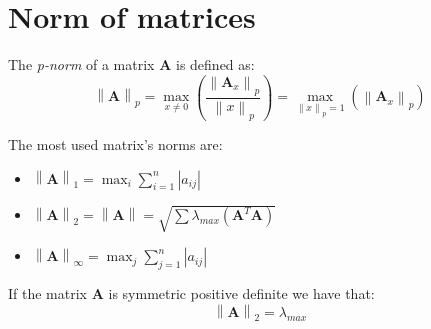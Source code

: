 \documentclass[12pt, a4paper]{report}
\newtheorem[style=M,bodystyle=\normalfont]{theorem}{Theorem}
\newtheorem[style=M,bodystyle=\normalfont]{proposition}{Proposition}
\newtheorem[style=M,bodystyle=\normalfont]{corollary}{Corollary}
\newtheorem[style=M,bodystyle=\normalfont]{lemma}{Lemma}
\newtheorem[style=M,bodystyle=\normalfont]{definition}{Definition}
\begin{document}
    \section{Norm of matrices}
    \begin{definition}
        The \emph{p-norm} of a matrix $\boldsymbol{A}$ is defined as: 
        \[\left\lVert \boldsymbol{A} \right\rVert_p=\max_{x \neq 0}{\left( \dfrac{\left\lVert \boldsymbol{A}_x \right\rVert_p}{\left\lVert x \right\rVert_p} \right)}=
        \max_{\left\lVert x \right\rVert_p=1}{\left( \left\lVert \boldsymbol{A}_x \right\rVert_p \right)}\]
    \end{definition}
    The most used matrix's norms are: 
    \begin{itemize}
        \item $\left\lVert \boldsymbol{A} \right\rVert_1=\max_{i}{\sum_{i=1}^{n}{\left\lvert a_{ij} \right\rvert}}$
        \item $\left\lVert \boldsymbol{A} \right\rVert_2=\left\lVert \boldsymbol{A} \right\rVert=\sqrt{\sum{\lambda_{max}{\left( \boldsymbol{A}^T\boldsymbol{A} \right)}}}$
        \item $\left\lVert \boldsymbol{A} \right\rVert_{\infty}=\max_{j}{\sum_{j=1}^{n}{\left\lvert a_{ij} \right\rvert}}$
    \end{itemize}
    \begin{proposition}
        If the matrix $\boldsymbol{A}$ is symmetric positive definite we have that: 
        \[\left\lVert \boldsymbol{A} \right\rVert_2=\lambda_{max}\]
    \end{proposition}

    
\end{document}

